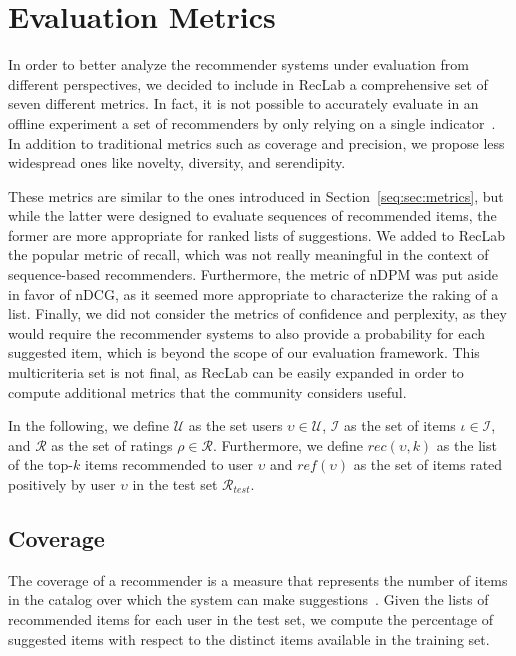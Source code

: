 \section{Evaluation Metrics}
\label{lab:sec:metrics}

In order to better analyze the recommender systems under evaluation from different perspectives, we decided to include in RecLab a comprehensive set of seven different metrics. In fact, it is not possible to accurately evaluate in an offline experiment a set of recommenders by only relying on a single indicator~\cite{Herlocker2004}. In addition to traditional metrics such as coverage and precision, we propose less widespread ones like novelty, diversity, and serendipity.

These metrics are similar to the ones introduced in Section~\ref{seq:sec:metrics}, but while the latter were designed to evaluate sequences of recommended items, the former are more appropriate for ranked lists of suggestions. We added to RecLab the popular metric of recall, which was not really meaningful in the context of sequence-based recommenders. Furthermore, the metric of nDPM was put aside in favor of nDCG, as it seemed more appropriate to characterize the raking of a list. Finally, we did not consider the metrics of confidence and perplexity, as they would require the recommender systems to also provide a probability for each suggested item, which is beyond the scope of our evaluation framework. This multicriteria set is not final, as RecLab can be easily expanded in order to compute additional metrics that the community considers useful.

In the following, we define $\mathcal{U}$ as the set users $\upsilon \in \mathcal{U}$, $\mathcal{I}$ as the set of items $\iota \in \mathcal{I}$, and $\mathcal{R}$ as the set of ratings $\rho \in \mathcal{R}$. Furthermore, we define $rec(\upsilon, k)$ as the list of the top-$k$ items recommended to user $\upsilon$ and $ref(\upsilon)$ as the set of items rated positively by user $\upsilon$ in the test set $\mathcal{R}_{test}$.

\subsection{Coverage}
The coverage of a recommender is a measure that represents the number of items in the catalog over which the system can make suggestions~\cite{Gunawardana2015}. Given the lists of recommended items for each user in the test set, we compute the percentage of suggested items with respect to the distinct items available in the training set.


